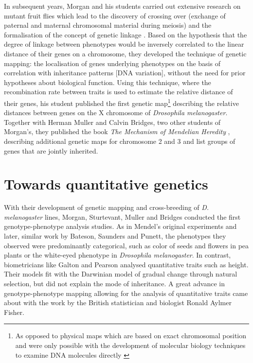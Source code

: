 In subsequent years, Morgan and his students carried out extensive research on mutant fruit flies which lead to the discovery of crossing over (exchange of paternal and maternal chromosomal material during meiosis) and the formalisation of the concept of genetic linkage \citep{Morgan1911b}. Based on the hypothesis that the degree of linkage between phenotypes would be inversely correlated to the linear distance of their genes on a chromosome, they developed the technique of genetic mapping: the localisation of genes underlying phenotypes on the basis of correlation with inheritance patterns [DNA variation], without the need for prior hypotheses about biological function. Using this technique, where the recombination rate between traits is used to estimate the relative distance of their genes, his student \citet{Sturtevant1913} published the first genetic map\footnote{As opposed to physical maps which are based on exact chromosomal position and were only possible with the development of molecular biology techniques to examine DNA molecules directly \citep{Brown2002}} describing the relative distances between genes on the X chromosome of \textit{Drosophila melanogaster}. Together with Herman Muller and Calvin Bridges, two other students of Morgan's, they published the book \textit{The Mechanism of Mendelian Heredity} \parencite*{Morgan1915}, describing additional genetic maps for chromosome 2 and 3 and list groups of genes that are jointly inherited. 

\section{Towards quantitative genetics}
With their development of genetic mapping and cross-breeding of \textit{D. melanogaster} lines, Morgan, Sturtevant, Muller and Bridges conducted the first genotype-phenotype analysis studies. As in Mendel's original experiments and later, similar work by Bateson, Saunders and Punett, the phenotypes they observed were predominantly categorical, such as color of seeds and flowers in pea plants or the white-eyed phenotype in \textit{Drosophila melanogaster}. In contrast, biometricians like Galton and Pearson analysed quantitative traits such as height. Their models fit with the Darwinian model of gradual change through natural selection, but did not explain the mode of inheritance.  A great advance in genotype-phenotype mapping allowing for the analysis of quantitative traits came about with the work by the British statistician and biologist Ronald Aylmer Fisher. 

